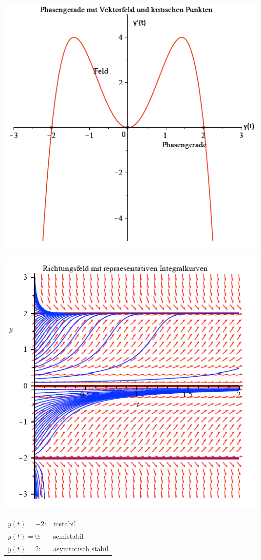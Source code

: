 \begin{minipage}[h]{0.35\textwidth} 
	\includegraphics[width=1.0\textwidth]{images/Phasengerade.png}
\end{minipage}
\begin{minipage}[h]{0.35\textwidth}
	\includegraphics[width=1.0\textwidth]{images/Richtungsfeld.png}
\end{minipage}
\begin{tabular}{p{1.8cm}p{5cm}}
	$y(t) = -2$: & instabil \\
	$y(t) = 0$: & semistabil\\
	$y(t) = 2$: & asymtotisch stabil\\
\end{tabular}

